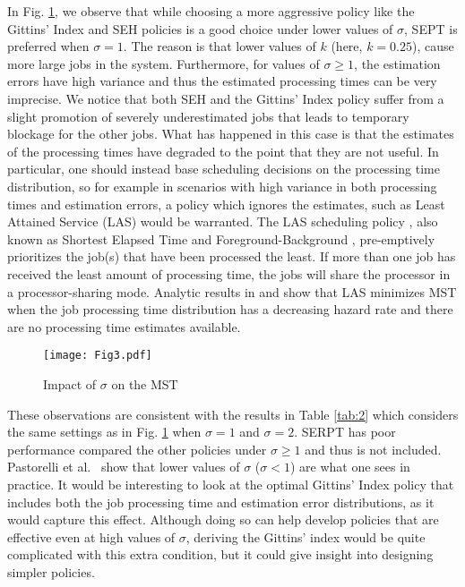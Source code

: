 In Fig. \ref{fig:25SigmaMST}, we observe that while choosing a more aggressive policy like the Gittins' Index and SEH policies is a good choice under lower values of $\sigma$, SEPT is preferred when $\sigma = 1$. The reason is that lower values of $k$ (here, $k=0.25$), cause more large jobs in the system. Furthermore, for values of ${\sigma \ge 1 }$, the estimation errors have high variance and thus the estimated processing
times can be very imprecise. We notice that both SEH and the Gittins' Index policy suffer from a slight promotion of severely underestimated jobs that leads to temporary blockage for the other jobs. What has happened in this case is that the estimates of the processing times have degraded to the point that they are not useful. In particular, one should instead base scheduling decisions on the processing time distribution, so for example in scenarios with high variance in both processing times and estimation errors, a policy which ignores the estimates, such as Least Attained Service (LAS) would be warranted. The LAS scheduling policy \cite {rai2003analysis}, also known as Shortest Elapsed Time \cite {coffman1973operating} and Foreground-Background \cite{kleinrock1975theory}, pre-emptively prioritizes the job(s) that have been processed the least. If more than one job has received the least amount of processing time, the jobs will share the processor in a processor-sharing mode. Analytic results in \cite{righter1989scheduling} and \cite {yashkov1987processor} show that LAS minimizes MST when the job processing time distribution has a decreasing hazard rate and there are no processing time estimates available.

\begin{figure}[ht]

  \texttt{[image: Fig3.pdf]}
  \centering
    \caption{Impact of $\sigma$ on the MST}
  \label{fig:25SigmaMST}

\end{figure} 

These observations are consistent with the results in Table \ref{tab:2} which considers the same settings as in Fig. \ref{fig:25SigmaMST} when $\sigma = 1$ and $\sigma = 2$. SERPT has poor performance compared the other policies under $\sigma \ge 1$ and thus is not included. Pastorelli et al.\ \cite{pastorelli2013hfsp} show that lower values of $\sigma$ ($\sigma < 1$) are what one sees in practice. It would be interesting to look at the optimal Gittins' Index policy that includes both the job processing time and estimation error distributions, as it would capture this effect. Although doing so can help develop policies that are effective even at high values of $\sigma$, deriving the Gittins' index would be quite complicated with this extra condition, but it could give insight into designing simpler policies. 


